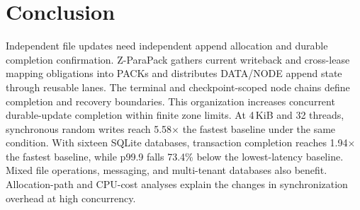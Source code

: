 \section{Conclusion}\label{sec:conclusion}
Independent file updates need independent append allocation and durable completion confirmation.
Z-ParaPack gathers current writeback and cross-lease mapping obligations into PACKs and distributes DATA/NODE append state through reusable lanes.
The terminal and checkpoint-scoped node chains define completion and recovery boundaries.
This organization increases concurrent durable-update completion within finite zone limits.
At 4\,KiB and 32 threads, synchronous random writes reach 5.58$\times$ the fastest baseline under the same condition.
With sixteen SQLite databases, transaction completion reaches 1.94$\times$ the fastest baseline, while p99.9 falls 73.4\% below the lowest-latency baseline.
Mixed file operations, messaging, and multi-tenant databases also benefit.
Allocation-path and CPU-cost analyses explain the changes in synchronization overhead at high concurrency.
